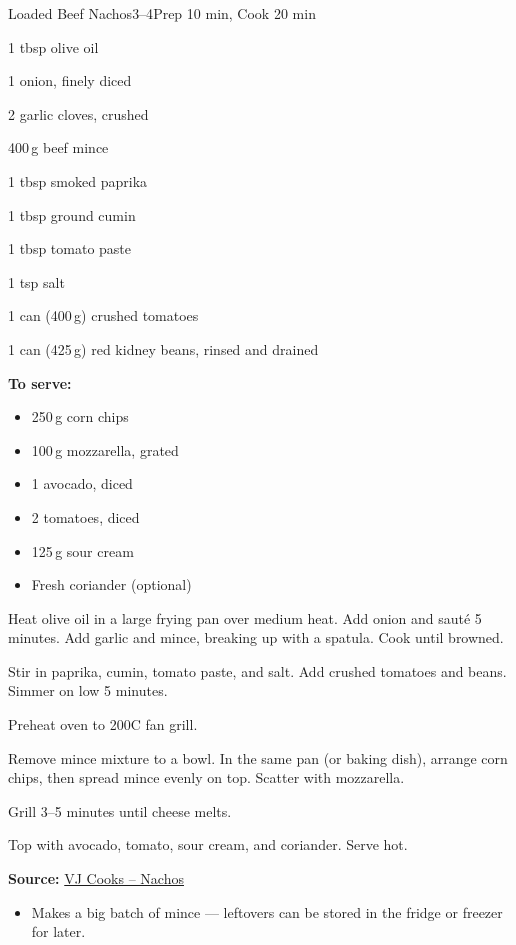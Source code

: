 \begin{recipebox}{Loaded Beef Nachos}{3--4}{Prep 10 min, Cook 20 min}
\begin{ingredients}
  \item 1 tbsp olive oil
  \item 1 onion, finely diced
  \item 2 garlic cloves, crushed
  \item 400\,g beef mince
  \item 1 tbsp smoked paprika
  \item 1 tbsp ground cumin
  \item 1 tbsp tomato paste
  \item 1 tsp salt
  \item 1 can (400\,g) crushed tomatoes
  \item 1 can (425\,g) red kidney beans, rinsed and drained
  \item \textbf{To serve:}
  \begin{itemize}
    \item 250\,g corn chips
    \item 100\,g mozzarella, grated
    \item 1 avocado, diced
    \item 2 tomatoes, diced
    \item 125\,g sour cream
    \item Fresh coriander (optional)
  \end{itemize}
\end{ingredients}

\begin{method}
  \item Heat olive oil in a large frying pan over medium heat. Add onion and sauté 5 minutes. Add garlic and mince, breaking up with a spatula. Cook until browned.
  \item Stir in paprika, cumin, tomato paste, and salt. Add crushed tomatoes and beans. Simmer on low 5 minutes.
  \item Preheat oven to 200\degree C fan grill.
  \item Remove mince mixture to a bowl. In the same pan (or baking dish), arrange corn chips, then spread mince evenly on top. Scatter with mozzarella.
  \item Grill 3--5 minutes until cheese melts.
  \item Top with avocado, tomato, sour cream, and coriander. Serve hot.
\end{method}

\textbf{Source:} \href{https://vjcooks.com/loaded-beef-nachos/#mv-creation-578-jtr}{VJ Cooks – Nachos}

\begin{notes}
\begin{itemize}
  \item Makes a big batch of mince — leftovers can be stored in the fridge or freezer for later.
\end{itemize}
\end{notes}
\end{recipebox}
